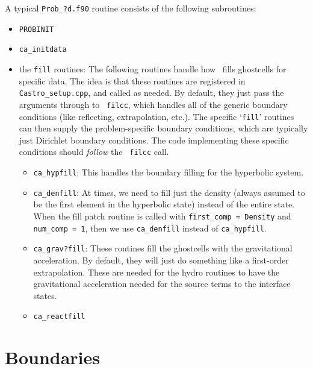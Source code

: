 A typical {\tt Prob\_?d.f90} routine consists of the following 
subroutines:
\begin{itemize}
\item {\tt PROBINIT}

\item {\tt ca\_initdata}

\item the {\tt *fill} routines: The following routines handle how
  \castro\ fills ghostcells for specific data.  The idea is that these
  routines are registered in {\tt Castro\_setup.cpp}, and called as
  needed.  By default, they just pass the arguments through to {\tt
    filcc}, which handles all of the generic boundary conditions (like
  reflecting, extrapolation, etc.).  The specific `{\tt fill}'
  routines can then supply the problem-specific boundary conditions,
  which are typically just Dirichlet boundary conditions.  The code
  implementing these specific conditions should {\em follow} the {\tt
    filcc} call.

\begin{itemize}
\item {\tt ca\_hypfill}:
  This handles the boundary filling for the hyperbolic system.

\item {\tt ca\_denfill}: At times, we need to fill just the density
  (always assumed to be the first element in the hyperbolic state)
  instead of the entire state.  When the fill patch routine is called
  with {\tt first\_comp = Density} and {\tt num\_comp = 1}, then we
  use {\tt ca\_denfill} instead of {\tt ca\_hypfill}.

\item {\tt ca\_grav?fill}: These routines fill the ghostcells with the
  gravitational acceleration.  By default, they will just do something
  like a first-order extrapolation.  These are needed for the hydro
  routines to have the gravitational acceleration needed for the 
  source terms to the interface states.

\item {\tt ca\_reactfill}
\end{itemize}

\end{itemize}


\section{Boundaries}
